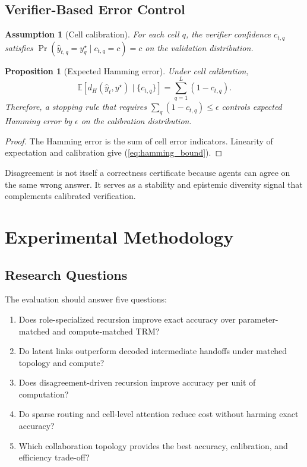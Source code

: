 \documentclass[10pt,a4paper,twocolumn]{article}
\newtheorem{proposition}{Proposition}
\newtheorem{assumption}{Assumption}
\begin{document}
\subsection{Verifier-Based Error Control}
\begin{assumption}[Cell calibration]
For each cell $q$, the verifier confidence $c_{t,q}$ satisfies $\Pr(\hat y_{t,q}=y_q^\star\mid c_{t,q}=c)=c$ on the validation distribution.
\end{assumption}

\begin{proposition}[Expected Hamming error]
Under cell calibration,
\begin{equation}
\mathbb{E}[d_H(\hat y_t,y^\star)\mid\{c_{t,q}\}]=\sum_{q=1}^{L}(1-c_{t,q}). \label{eq:hamming_bound}
\end{equation}
Therefore, a stopping rule that requires $\sum_q(1-c_{t,q})\le\epsilon$ controls expected Hamming error by $\epsilon$ on the calibration distribution.
\end{proposition}
\begin{proof}
The Hamming error is the sum of cell error indicators. Linearity of expectation and calibration give (\ref{eq:hamming_bound}).
\end{proof}

Disagreement is not itself a correctness certificate because agents can agree on the same wrong answer. It serves as a stability and epistemic diversity signal that complements calibrated verification.

\section{Experimental Methodology}
\subsection{Research Questions}
The evaluation should answer five questions:
\begin{enumerate}[label=\textbf{RQ\arabic*:}]
\item Does role-specialized recursion improve exact accuracy over parameter-matched and compute-matched TRM?
\item Do latent links outperform decoded intermediate handoffs under matched topology and compute?
\item Does disagreement-driven recursion improve accuracy per unit of computation?
\item Do sparse routing and cell-level attention reduce cost without harming exact accuracy?
\item Which collaboration topology provides the best accuracy, calibration, and efficiency trade-off?
\end{enumerate}
\end{document}
